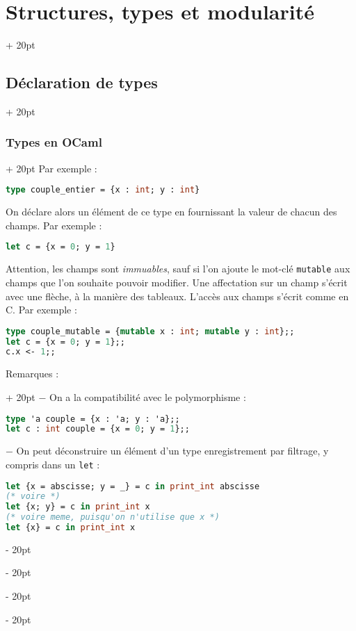 \documentclass[a4paper, 12pt, twoside]{article}
\newcommand{\ind}[1][20pt]{\advance\leftskip + #1}
\newcommand{\deind}[1][20pt]{\advance\leftskip - #1}
\newenvironment{indt}[2][20pt]{#2 \par \ind[#1]}{\par \deind} %
\begin{document}
\begin{indt}{\section{Structures, types et modularité}}
\begin{indt}{\subsection{Déclaration de types}}
\begin{indt}{\subsubsection{Types en OCaml}}
                Par exemple :
                \begin{lstlisting}[language=Caml, xleftmargin=80pt]
type couple_entier = {x : int; y : int}\end{lstlisting}
                
                \vspace{6pt}
                
                On déclare alors un élément de ce type en fournissant la valeur de chacun des champs. Par exemple :
                \begin{lstlisting}[language=Caml, xleftmargin=80pt]
let c = {x = 0; y = 1}\end{lstlisting}
                
                \vspace{6pt}
                
                Attention, les champs sont \textit{immuables}, sauf si l’on ajoute le mot-clé \texttt{mutable} aux champs que l’on souhaite pouvoir modifier. Une affectation sur un champ s’écrit avec une flèche, à la manière des tableaux. L’accès aux champs s’écrit comme en C. Par exemple :
                
                \begin{lstlisting}[language=Caml, xleftmargin=80pt]
type couple_mutable = {mutable x : int; mutable y : int};;
let c = {x = 0; y = 1};;
c.x <- 1;;\end{lstlisting}
                
                \vspace{6pt}
                
                \begin{indt}{Remarques :}
                    $-$ On a la compatibilité avec le polymorphisme :
                    \begin{lstlisting}[language=Caml, xleftmargin=100pt]
type 'a couple = {x : 'a; y : 'a};;
let c : int couple = {x = 0; y = 1};;\end{lstlisting}
                    
                    \vspace{6pt}
                    
                    $-$ On peut déconstruire un élément d’un type enregistrement par filtrage, y compris dans un \texttt{let} :
                    \begin{lstlisting}[language=Caml, xleftmargin=100pt]
let {x = abscisse; y = _} = c in print_int abscisse
(* voire *)
let {x; y} = c in print_int x
(* voire meme, puisqu'on n'utilise que x *)
let {x} = c in print_int x\end{lstlisting}
                \end{indt}
                

\end{indt}
\end{indt}
\end{indt}
\end{document}
